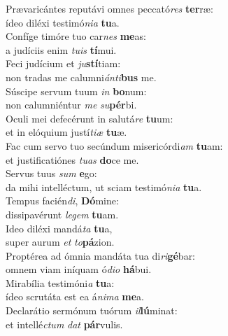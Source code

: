 \oddverse Prævaricántes reputávi omnes peccató\textit{res} \textbf{ter}ræ:~\*\\
\oddverse ídeo diléxi testimó\textit{ni}\textit{a} \textbf{tu}a.\\
\evenverse Confíge timóre tuo car\textit{nes} \textbf{me}as:~\*\\
\evenverse a judíciis enim \textit{tu}\textit{is} \textbf{tí}mui.\\
\oddverse Feci judícium et \textit{ju}\textbf{stí}tiam:~\*\\
\oddverse non tradas me calumni\textit{án}\textit{ti}\textbf{bus} me.\\
\evenverse Súscipe servum tuum \textit{in} \textbf{bo}num:~\*\\
\evenverse non calumniéntur \textit{me} \textit{su}\textbf{pér}bi.\\
\oddverse Oculi mei defecérunt in salutá\textit{re} \textbf{tu}um:~\*\\
\oddverse et in elóquium justí\textit{ti}\textit{æ} \textbf{tu}æ.\\
\evenverse Fac cum servo tuo secúndum misericórdi\textit{am} \textbf{tu}am:~\*\\
\evenverse et justificatiónes \textit{tu}\textit{as} \textbf{do}ce me.\\
\oddverse Servus tuus \textit{sum} \textbf{e}go:~\*\\
\oddverse da mihi intelléctum, ut sciam testimó\textit{ni}\textit{a} \textbf{tu}a.\\
\evenverse Tempus facién\textit{di}, \textbf{Dó}mine:~\*\\
\evenverse dissipavérunt \textit{le}\textit{gem} \textbf{tu}am.\\
\oddverse Ideo diléxi mandá\textit{ta} \textbf{tu}a,~\*\\
\oddverse super aurum \textit{et} \textit{to}\textbf{pá}zion.\\
\evenverse Proptérea ad ómnia mandáta tua di\textit{ri}\textbf{gé}bar:~\*\\
\evenverse omnem viam iníquam ó\textit{di}\textit{o} \textbf{há}bui.\\
\oddverse Mirabília testimóni\textit{a} \textbf{tu}a:~\*\\
\oddverse ídeo scrutáta est ea á\textit{ni}\textit{ma} \textbf{me}a.\\
\evenverse Declarátio sermónum tuórum \textit{il}\textbf{lú}minat:~\*\\
\evenverse et intellé\textit{ctum} \textit{dat} \textbf{pár}vulis.\\
